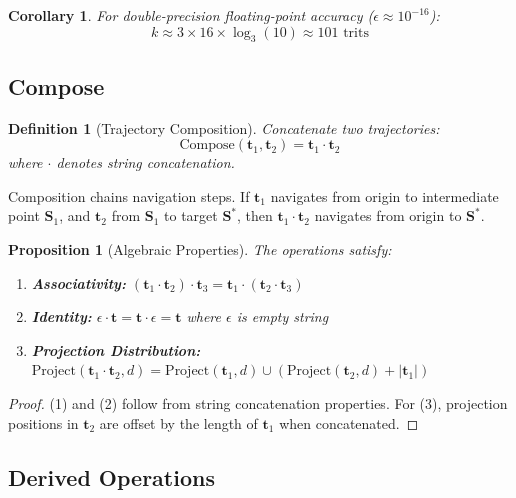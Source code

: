 \documentclass[twocolumn,10pt]{article}
\newtheorem{corollary}[theorem]{Corollary}
\newtheorem{definition}[theorem]{Definition}
\newtheorem{proposition}[theorem]{Proposition}
\theoremstyle{remark}
\newcommand{\Scoord}{\mathbf{S}}
\begin{document}
\begin{corollary}
For double-precision floating-point accuracy ($\epsilon \approx 10^{-16}$):
\begin{equation}
k \approx 3 \times 16 \times \log_3(10) \approx 101 \text{ trits}
\end{equation}
\end{corollary}

\subsection{Compose}

\begin{definition}[Trajectory Composition]
Concatenate two trajectories:
\begin{equation}
\text{Compose}(\mathbf{t}_1, \mathbf{t}_2) = \mathbf{t}_1 \cdot \mathbf{t}_2
\end{equation}
where $\cdot$ denotes string concatenation.
\end{definition}

Composition chains navigation steps. If $\mathbf{t}_1$ navigates from origin to intermediate point $\Scoord_1$, and $\mathbf{t}_2$ from $\Scoord_1$ to target $\Scoord^*$, then $\mathbf{t}_1 \cdot \mathbf{t}_2$ navigates from origin to $\Scoord^*$.

\begin{proposition}[Algebraic Properties]
The operations satisfy:
\begin{enumerate}
\item \textbf{Associativity:} $(\mathbf{t}_1 \cdot \mathbf{t}_2) \cdot \mathbf{t}_3 = \mathbf{t}_1 \cdot (\mathbf{t}_2 \cdot \mathbf{t}_3)$
\item \textbf{Identity:} $\epsilon \cdot \mathbf{t} = \mathbf{t} \cdot \epsilon = \mathbf{t}$ where $\epsilon$ is empty string
\item \textbf{Projection Distribution:} $\text{Project}(\mathbf{t}_1 \cdot \mathbf{t}_2, d) = \text{Project}(\mathbf{t}_1, d) \cup (\text{Project}(\mathbf{t}_2, d) + |\mathbf{t}_1|)$
\end{enumerate}
\end{proposition}

\begin{proof}
(1) and (2) follow from string concatenation properties. For (3), projection positions in $\mathbf{t}_2$ are offset by the length of $\mathbf{t}_1$ when concatenated.
\end{proof}

\subsection{Derived Operations}
\end{document}
